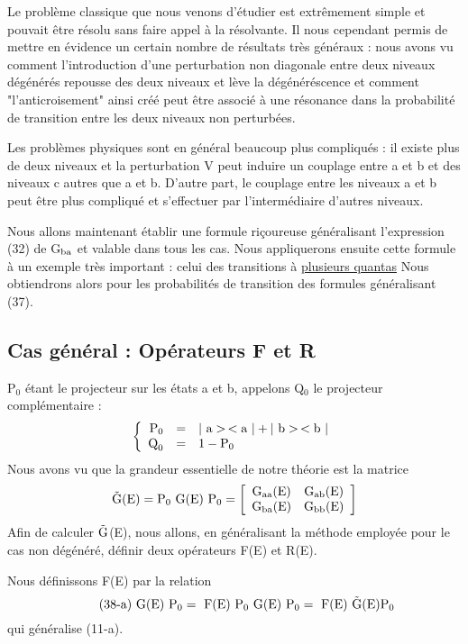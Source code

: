 Le problème classique que nous venons d'étudier est extrêmement simple
et pouvait être résolu sans faire appel à la résolvante. Il nous  cependant permis
de mettre en évidence un certain nombre de résultats très généraux : nous
avons vu comment l'introduction d'une perturbation non diagonale entre deux niveaux
dégénérés repousse des deux niveaux et lève la dégénéréscence et comment
"l'anticroisement" ainsi créé peut être associé à une résonance dans la probabilité
de transition entre les deux niveaux non perturbées.

Les problèmes physiques sont en général beaucoup plus compliqués : il
existe plus de deux niveaux et la perturbation V peut induire un couplage entre
a et b et des niveaux c autres que a et b. D'autre part, le couplage entre les
niveaux a et b peut être plus compliqué et s'effectuer par l'intermédiaire d'autres niveaux.

Nous allons maintenant établir une formule riçoureuse généralisant
l'expression (32) de G$_{\text{ba}}$ et valable dans tous les cas. Nous appliquerons ensuite
cette formule à un exemple très important : celui des transitions à \ul{plusieurs
quantas} Nous obtiendrons alors pour les probabilités de transition des
formules généralisant (37).

\subsection{Cas général : Opérateurs F et R}%
P$_0$ étant le projecteur sur les états a et b, appelons Q$_0$ le projecteur complémentaire :
\[
\left\{ \begin{array}{rcl}
\text{P}_0 & = & |\text{ a}>\,<\text{a }|+|\text{ b}>\,<\text{b }| \\
\text{Q}_0 & = & 1-\text{P}_0 \end{array} \right.
\]
Nous avons vu que la grandeur essentielle de notre théorie est la matrice
\[
\tilde{\text{G}}\text{(E)}=\text{P}_0\text{ G(E) }\text{P}_0=
\left[ \begin{array}{cc}
\text{G}_{\text{aa}}\text{(E)} & \text{G}_{\text{ab}}\text{(E)} \\
\text{G}_{\text{ba}}\text{(E)} & \text{G}_{\text{bb}}\text{(E)} \end{array} \right]
\]
Afin de calculer $\tilde{\text{G}}$(E), nous allons, en généralisant la méthode employée
pour le cas non dégénéré, définir deux opérateurs F(E) et R(E).

Nous définissons F(E) par la relation
\[
\tag{38-a}\text{ G(E) }\text{P}_0=\text{ F(E) }\text{P}_0\text{ G(E) }\text{P}_0=\text{ F(E) }\tilde{\text{G}}\text{(E)}\text{P}_0
\]
qui généralise (11-a).

